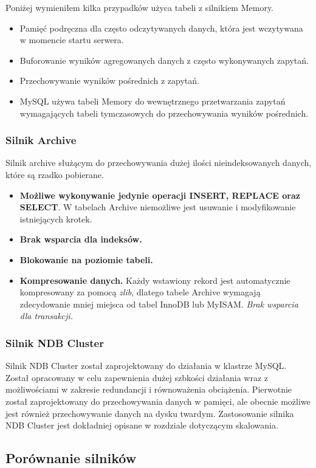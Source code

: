  Poniżej wymieniłem kilka przypadków użyca tabeli z silnikiem Memory. 
\begin{itemize}
	\item Pamięć podręczna dla często odczytywanych danych, która jest wczytywana w momencie startu serwera.
	\item Buforowanie wyników agregowanych danych z często wykonywanych zapytań.
	\item Przechowywanie wyników pośrednich z zapytań.
	\item MySQL używa tabeli Memory do wewnętrznego przetwarzania zapytań wymagających tabeli tymczasowych do przechowywania wyników pośrednich.
\end{itemize}

\subsubsection{Silnik Archive}
Silnik archive służącym do przechowywania dużej ilości nieindeksowanych danych, które są rzadko pobierane. 

\begin{itemize}
	\item \textbf{Możliwe wykonywanie jedynie operacji INSERT, REPLACE oraz SELECT}. W tabelach Archive niemożliwe jest usuwanie i modyfikowanie istniejących krotek.
	\item \textbf{Brak wsparcia dla indeksów.}
	\item \textbf{Blokowanie na poziomie tabeli.}
	\item \textbf{Kompresowanie danych.} Każdy wstawiony rekord jest automatycznie kompresowany za pomocą \textit{zlib}, dlatego tabele Archive wymagają zdecydowanie mniej miejsca od tabel InnoDB lub MyISAM.
	\textit{Brak wsparcia dla transakcji.}
\end{itemize}

\subsubsection{Silnik NDB Cluster}
Silnik NDB Cluster został zaprojektowany do działania w klastrze MySQL. Został opracowany w celu zapewnienia dużej szbkości działania wraz z możliwościami w zakresie redundancji i równoważenia obciążenia. Pierwotnie został zaprojektowany do przechowywania danych w pamięci, ale obecnie możliwe jest również przechowywanie danych na dysku twardym. Zastosowanie silnika NDB Cluster jest dokładniej opisane w rozdziale dotyczącym skalowania.

\subsection{Porównanie silników}



